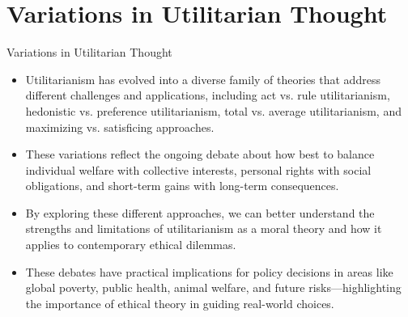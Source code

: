 \documentclass[aspectratio=169]{beamer}
\begin{document}
\section{Variations in Utilitarian Thought}
\begin{frame}{Variations in Utilitarian Thought}
    \begin{itemize}
        \item Utilitarianism has evolved into a diverse family of theories that address different challenges and applications, including act vs. rule utilitarianism, hedonistic vs. preference utilitarianism, total vs. average utilitarianism, and maximizing vs. satisficing approaches.
        
        \item These variations reflect the ongoing debate about how best to balance individual welfare with collective interests, personal rights with social obligations, and short-term gains with long-term consequences.
        
        \item By exploring these different approaches, we can better understand the strengths and limitations of utilitarianism as a moral theory and how it applies to contemporary ethical dilemmas.
        
        \item These debates have practical implications for policy decisions in areas like global poverty, public health, animal welfare, and future risks—highlighting the importance of ethical theory in guiding real-world choices.
    \end{itemize}

\end{frame}
\end{document}

